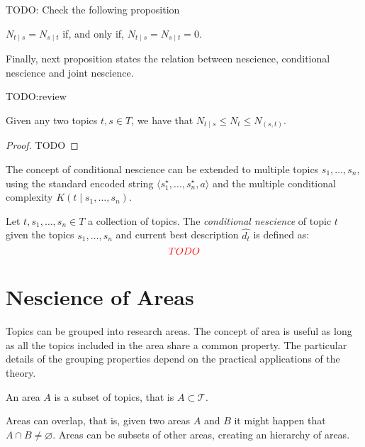 {\color{red} TODO: Check the following proposition}

\begin{proposition}
$N_{t \mid s} = N_{s \mid t}$ if, and only if, $N_{t \mid s} = N_{s \mid t} = 0$.
\end{proposition}

Finally, next proposition states the relation between nescience, conditional nescience and joint nescience.

{\color{red} TODO:review}

\begin{proposition}
Given any two topics $t, s \in T$, we have that $N_{t \mid s} \leq N_{t} \leq N_{(s, t)}$.
\end{proposition}
\begin{proof}
{\color{red} TODO}
\end{proof}

The concept of conditional nescience can be extended to multiple topics $s_1, \ldots, s_n$, using the standard encoded string $\langle s_1^\star, \ldots, s_n^\star, a \rangle$ and the multiple conditional complexity $K (t \mid s_1, \ldots, s_n)$.

\begin{definition}
Let $t, s_1, \ldots, s_n \in T$ a collection of topics. The \emph{conditional nescience} of topic $t$ given the topics $s_1, \ldots, s_n$ and current best description $\hat{d_t}$ is defined as: 
\[
{\color{red} TODO}
\]
\end{definition}

%
%

\section{Nescience of Areas}
\label{sec:nescience_areas}

Topics can be grouped into research areas. The concept of area is useful as long as all the topics included in the area share a common property. The particular details of the grouping properties depend on the practical applications of the theory.

\begin{definition}
An area $A$ is a subset of topics, that is $A \subset \mathcal{T}$.
\end{definition}

Areas can overlap, that is, given two areas $A$ and $B$ it might happen that $A \cap B \neq \varnothing$. Areas can be subsets of other areas, creating an hierarchy of areas.

